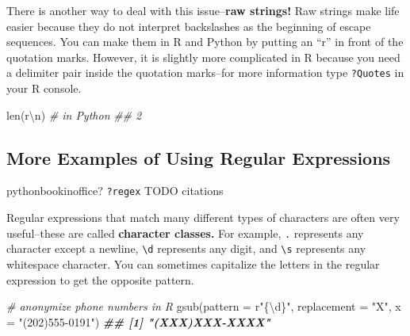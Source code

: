 \documentclass[
  12pt,
  krantz2]{krantz}
\makeatletter
\newenvironment{Shaded}{\begin{snugshade}}{\end{snugshade}}
\newcommand{\AttributeTok}[1]{\textcolor[rgb]{0.61,0.61,0.61}{#1}}
\newcommand{\BuiltInTok}[1]{#1}
\newcommand{\CommentTok}[1]{\textcolor[rgb]{0.37,0.37,0.37}{\textit{#1}}}
\newcommand{\DocumentationTok}[1]{\textcolor[rgb]{0.37,0.37,0.37}{\textbf{\textit{#1}}}}
\newcommand{\FunctionTok}[1]{\textcolor[rgb]{0,0,0}{#1}}
\newcommand{\NormalTok}[1]{#1}
\newcommand{\StringTok}[1]{\textcolor[rgb]{0.5,0.5,0.5}{#1}}
\newcommand{\VerbatimStringTok}[1]{\textcolor[rgb]{0.5,0.5,0.5}{#1}}
\newenvironment{kframe}{%
\medskip{}
\setlength{\fboxsep}{.8em}
 \def\at@end@of@kframe{}%
 \ifinner\ifhmode%
  \def\at@end@of@kframe{\end{minipage}}%
  \begin{minipage}{\columnwidth}%
 \fi\fi%
 \def\FrameCommand##1{\hskip\@totalleftmargin \hskip-\fboxsep
 \colorbox{shadecolor}{##1}\hskip-\fboxsep
     \hskip-\linewidth \hskip-\@totalleftmargin \hskip\columnwidth}%
 \MakeFramed {\advance\hsize-\width
   \@totalleftmargin\z@ \linewidth\hsize
   \@setminipage}}%
 {\par\unskip\endMakeFramed%
 \at@end@of@kframe}
\renewenvironment{Shaded}{\begin{kframe}}{\end{kframe}}
\makeatother
\begin{document}
There is another way to deal with this issue--\textbf{raw strings!} Raw strings make life easier because they do not interpret backslashes as the beginning of escape sequences. You can make them in R and Python by putting an ``r'' in front of the quotation marks. However, it is slightly more complicated in R because you need a delimiter pair inside the quotation marks--for more information type \texttt{?Quotes} in your R console.

\begin{Shaded}
\begin{Highlighting}[]
\BuiltInTok{len}\NormalTok{(}\VerbatimStringTok{r\textquotesingle{}\textbackslash{}n\textquotesingle{}}\NormalTok{) }\CommentTok{\# in Python }
\CommentTok{\#\# 2}
\end{Highlighting}
\end{Shaded}

\begin{Shaded}
\end{Shaded}

\hypertarget{more-examples-of-using-regular-expressions}{%
\subsection{More Examples of Using Regular Expressions}\label{more-examples-of-using-regular-expressions}}

\citep{rfords} pythonbookinoffice? \texttt{?regex} TODO citations

Regular expressions that match many different types of characters are often very useful--these are called \textbf{character classes.} For example, \texttt{.} represents any character except a newline, \texttt{\textbackslash{}d} represents any digit, and \texttt{\textbackslash{}s} represents any whitespace character. You can sometimes capitalize the letters in the regular expression to get the opposite pattern.

\begin{Shaded}
\begin{Highlighting}[]
\CommentTok{\# anonymize phone numbers in R}
\FunctionTok{gsub}\NormalTok{(}\AttributeTok{pattern =}\NormalTok{ r}\StringTok{"\{\textbackslash{}d\}"}\NormalTok{, }\AttributeTok{replacement =} \StringTok{"X"}\NormalTok{, }\AttributeTok{x =} \StringTok{"(202)555{-}0191"}\NormalTok{)}
\DocumentationTok{\#\# [1] "(XXX)XXX{-}XXXX"}
\end{Highlighting}
\end{Shaded}
\end{document}
